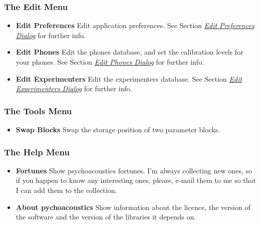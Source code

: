 \documentclass[a4paper,12pt,english]{sphinxmanual}
\begin{document}
\subsubsection{The Edit Menu}
\label{graphical_user_interface:the-edit-menu}\begin{itemize}
\item {} 
\textbf{Edit Preferences} Edit application preferences. See
Section {\hyperref[graphical_user_interface:sec-edit-preferences-dia]{\emph{Edit Preferences Dialog}}} for further info.

\item {} 
\textbf{Edit Phones} Edit the phones database, and set the calibration
levels for your phones. See Section {\hyperref[graphical_user_interface:sec-edit-phones-dia]{\emph{Edit Phones Dialog}}} for
further info.

\item {} 
\textbf{Edit Experimenters} Edit the experimenters database. See
Section {\hyperref[graphical_user_interface:sec-edit-experimenters-dia]{\emph{Edit Experimenters Dialog}}} for further info.

\end{itemize}


\subsubsection{The Tools Menu}
\label{graphical_user_interface:the-tools-menu}\begin{itemize}
\item {} 
\textbf{Swap Blocks} Swap the storage position of two parameter blocks.

\end{itemize}


\subsubsection{The Help Menu}
\label{graphical_user_interface:the-help-menu}\begin{itemize}
\item {} 
\textbf{Fortunes} Show psychoacoustics fortunes. I’m always collecting new
ones, so if you happen to know any interesting ones, please, e-mail
them to me so that I can add them to the collection.

\item {} 
\textbf{About pychoacoustics} Show information about the licence, the
version of the software and the version of the libraries it depends
on.

\end{itemize}
\end{document}
